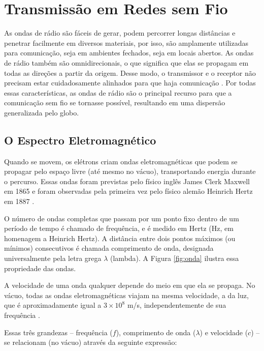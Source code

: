\chapter{Transmissão em Redes sem Fio}
\label{cap:transmissao-redes-sem-fio}

As ondas de rádio são fáceis de gerar, podem percorrer longas distâncias e penetrar facilmente em diversos materiais, por isso, são amplamente utilizadas para comunicação, seja em ambientes fechados, seja em locais abertos. As ondas de rádio também são omnidirecionais, o que significa que elas se propagam em todas as direções a partir da origem. Desse modo, o transmissor e o receptor não precisam estar cuidadosamente alinhados para que haja comunicação \cite{tanenbaum2011}. Por todas essas características, as ondas de rádio são o principal recurso para que a comunicação sem fio se tornasse possível, resultando em uma dispersão generalizada pelo globo.

\section{O Espectro Eletromagnético}
\label{sec:espectro-eletromagnetico}

Quando se movem, os elétrons criam ondas eletromagnéticas que podem se propagar pelo espaço livre (até mesmo no vácuo), transportando energia durante o percurso. Essas ondas foram previstas pelo físico inglês James Clerk Maxwell em 1865 e foram observadas pela primeira vez pelo físico alemão Heinrich Hertz em 1887 \cite{tanenbaum2011}.

O número de ondas completas que passam por um ponto fixo dentro de um período de tempo é chamado de frequência, e é medido em Hertz (Hz, em homenagem a Heinrich Hertz). A distância entre dois pontos máximos (ou mínimos) consecutivos é chamada comprimento de onda, designada universalmente pela letra grega $\lambda$ (lambda). A Figura \ref{fig:onda} ilustra essa propriedade das ondas.

A velocidade de uma onda qualquer depende do meio em que ela se propaga. No vácuo, todas as ondas eletromagnéticas viajam na mesma velocidade, a da luz, que é aproximadamente igual a $3 \times 10^8$ m/s, independentemente de sua frequência \cite{tanenbaum2011}.

Essas três grandezas -- frequência ($f$), comprimento de onda ($\lambda$) e velocidade ($c$) -- se relacionam (no vácuo) através da seguinte expressão:

